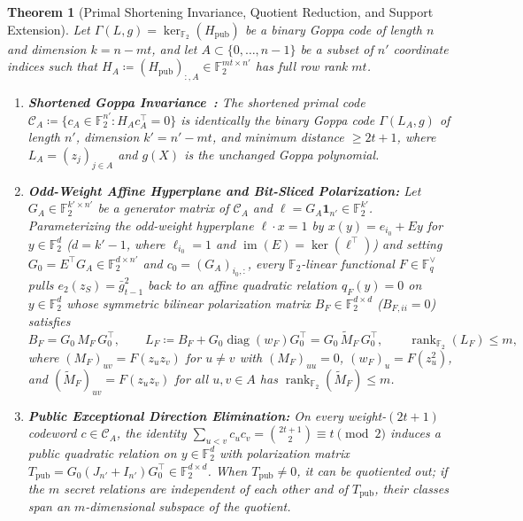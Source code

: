 \documentclass[11pt,a4paper]{article}
\newtheorem{theorem}{Theorem}
\theoremstyle{definition}
\theoremstyle{remark}
\newcommand{\F}{\mathbb{F}}
\newcommand{\rk}{\operatorname{rank}}
\newcommand{\diag}{\operatorname{diag}}
\begin{document}
\begin{theorem}[Primal Shortening Invariance, Quotient Reduction, and Support Extension]
\label{thm:shortened-lift}
Let $\Gamma(L, g) = \ker_{\F_2}(H_{\text{pub}})$ be a binary Goppa code of length $n$ and dimension $k = n - mt$, and let $A \subset \{0, \dots, n-1\}$ be a subset of $n'$ coordinate indices such that $H_A \coloneqq (H_{\text{pub}})_{:, A} \in \F_2^{mt \times n'}$ has full row rank $mt$.
\begin{enumerate}[leftmargin=2em]
    \item \textbf{Shortened Goppa Invariance~\cite{MS77,KM23}:}
    The shortened primal code $\mathcal{C}_A \coloneqq \{c_A \in \F_2^{n'} : H_A c_A^\top = 0\}$ is identically the binary Goppa code $\Gamma(L_A, g)$ of length $n'$, dimension $k' = n' - mt$, and minimum distance $\ge 2t + 1$, where $L_A = (z_j)_{j \in A}$ and $g(X)$ is the unchanged Goppa polynomial.
    \item \textbf{Odd-Weight Affine Hyperplane and Bit-Sliced Polarization:}
    Let $G_A \in \F_2^{k' \times n'}$ be a generator matrix of $\mathcal{C}_A$ and $\ell = G_A \mathbf{1}_{n'} \in \F_2^{k'}$. Parameterizing the odd-weight hyperplane $\ell \cdot x = 1$ by $x(y) = e_{i_0} + E y$ for $y \in \F_2^d$ ($d = k' - 1$, where $\ell_{i_0} = 1$ and $\operatorname{im}(E) = \ker(\ell^\top)$) and setting $G_0 = E^\top G_A \in \F_2^{d \times n'}$ and $c_0 = (G_A)_{i_0, :}$, every $\F_2$-linear functional $F \in \F_q^\vee$ pulls $e_2(z_S) = \bar{g}_{t-1}^2$ back to an affine quadratic relation $q_F(y) = 0$ on $y \in \F_2^d$ whose symmetric bilinear polarization matrix $B_F \in \F_2^{d \times d}$ ($B_{F,ii} = 0$) satisfies
    \begin{equation}
    \label{eq:bf-decomp}
        B_F = G_0\,M_F\,G_0^\top,
        \qquad
        L_F \coloneqq B_F + G_0 \diag(w_F) G_0^\top = G_0\,\widetilde{M}_F\,G_0^\top,
        \qquad
        \rk_{\F_2}(L_F) \le m,
    \end{equation}
    where $(M_F)_{uv} = F(z_u z_v)$ for $u \neq v$ with $(M_F)_{uu} = 0$, $(w_F)_u = F(z_u^2)$, and $(\widetilde{M}_F)_{uv} = F(z_u z_v)$ for all $u, v \in A$ has $\rk_{\F_2}(\widetilde{M}_F) \le m$.
    \item \textbf{Public Exceptional Direction Elimination:}
    On every weight-$(2t+1)$ codeword $c \in \mathcal{C}_A$, the identity $\sum_{u < v} c_u c_v = \binom{2t+1}{2} \equiv t \pmod 2$ induces a public quadratic relation on $y \in \F_2^d$ with polarization matrix $T_{\text{pub}} = G_0 (J_{n'} + I_{n'}) G_0^\top \in \F_2^{d \times d}$. When $T_{\text{pub}} \neq 0$, it can be quotiented out; if the $m$ secret relations are independent of each other and of $T_{\text{pub}}$, their classes span an $m$-dimensional subspace of the quotient.

\end{enumerate}
\end{theorem}
\end{document}
